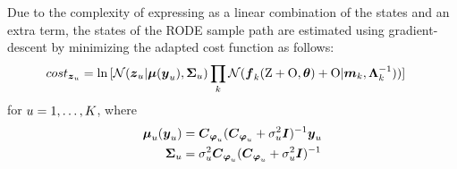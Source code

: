 Due to the complexity of expressing as a linear combination of the states and an extra term, the states of the RODE sample path are estimated using gradient-descent by minimizing the adapted cost function  as follows:
\begin{align}
    cost_{\boldsymbol{z}_u} 
    &= \ln{[\mathcal{N}(\boldsymbol{z}_u\vert\boldsymbol{\mu}(\boldsymbol{y}_u), \boldsymbol{\Sigma}_{u})\prod_k{
        \mathcal{N}(\boldsymbol{f}_k(\mathrm{Z} + \mathrm{O}, \boldsymbol{\theta}) + \mathrm{O}\vert\boldsymbol{m}_{k},\boldsymbol{\Lambda}_{k}^{-1}))]}
    }
\end{align}
for $u = 1,\dots,K$,  where
\begin{align}
    \boldsymbol{\mu}_{u}(\boldsymbol{y}_{u}) &= \boldsymbol{C}_{\boldsymbol{\varphi}_{u}}(\boldsymbol{C}_{\boldsymbol{\varphi}_{u}} + \sigma_{u}^2\boldsymbol{I})^{-1}\boldsymbol{y}_{u}
    \\
    \boldsymbol{\Sigma}_{u} &= \sigma_{u}^2\boldsymbol{C}_{\boldsymbol{\varphi}_{u}}(\boldsymbol{C}_{\boldsymbol{\varphi}_{u}} + \sigma_{u}^2\boldsymbol{I})^{-1}
\end{align}
